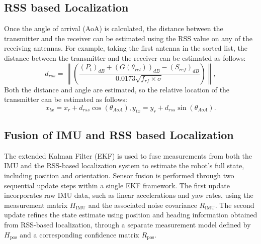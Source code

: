 \documentclass{ifacconf}
\begin{document}
\subsection{RSS based Localization}
Once the angle of arrival (AoA) is calculated, the distance between the transmitter and the receiver can be estimated using the RSS value on any of the receiving antennas. For example, taking the first antenna in the sorted list, the distance between the transmitter and the receiver can be estimated as follows:
\begin{equation}
    d_{rss} = \left\|(\frac{(P_t)_{dB} + (G(\theta_{rel}))_{dB}-(S_{ref})_{dB}}{0.0173 \sqrt{f_{rf} \times \sigma}})\right\|,
\end{equation}
Both the distance and angle are estimated, so the relative location of the transmitter can be estimated as follows:
\begin{equation}
    x_{tx} = x_r + d_{rss} \cos(\theta_{AoA}),
    y_{tx} = y_r + d_{rss} \sin(\theta_{AoA}).
\end{equation}

\subsection{Fusion of IMU and RSS based Localization}
The extended Kalman Filter (EKF) is used to fuse measurements from both the IMU and the RSS-based localization system to estimate the robot's full state, including position and orientation. Sensor fusion is performed through two sequential update steps within a single EKF framework. The first update incorporates raw IMU data, such as linear accelerations and yaw rates, using the measurement matrix \( H_{\text{IMU}} \) and the associated noise covariance \( R_{\text{IMU}} \). The second update refines the state estimate using position and heading information obtained from RSS-based localization, through a separate measurement model defined by \( H_{\text{pos}} \) and a corresponding confidence matrix \( R_{\text{pos}} \).
\end{document}

